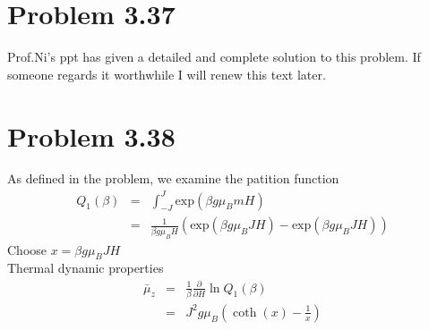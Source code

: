 \documentclass{article}
\begin{document}
\section*{Problem 3.37}
Prof.Ni's ppt has given a detailed and complete solution to this problem. If someone regards it worthwhile I will renew this text later.
\section*{Problem 3.38}
As defined in the problem, we examine the patition function
\begin{eqnarray*}
Q_1(\beta)&=&\int_{-J}^J\mathrm{exp}(\beta g \mu_BmH)\\
&=&\frac{1}{\beta g \mu_BH}(\mathrm{exp}(\beta g \mu_BJH)-\mathrm{exp}(\beta g \mu_B JH))
\end{eqnarray*}
Choose $x=\beta g \mu_BJH$\\
Thermal dynamic properties
\begin{eqnarray*}
\bar{\mu}_z&=&\frac{1}{\beta}\frac{\partial}{\partial H}\ln Q_1(\beta)\\
&=&J^2g\mu_B(\coth (x)-\frac{1}{x})
\end{eqnarray*}
\end{document}
